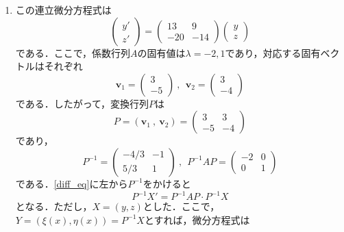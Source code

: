 \documentclass[a4paper,pdflatex,ja=standard]{bxjsarticle}
\begin{document}
\begin{enumerate}
  \item 
  この連立微分方程式は
  \begin{equation}
    \begin{pmatrix}
      y' \\
      z'
    \end{pmatrix}
    =
    \begin{pmatrix}
      13 & 9 \\
      -20 & -14
    \end{pmatrix}
    \begin{pmatrix}
      y \\
      z
    \end{pmatrix}
    \label{diff_eq}
  \end{equation}
  である．ここで，係数行列$A$の固有値は$\lambda=-2,1$であり，対応する固有ベクトルはそれぞれ
  \begin{equation}
    \bm{v}_{1}
    =
    \begin{pmatrix}
      3 \\
      -5
    \end{pmatrix}
    \ ,\ \ 
    \bm{v}_{2}
    =
    \begin{pmatrix}
      3 \\
      -4
    \end{pmatrix}
  \end{equation}
  である．したがって，変換行列$P$は
  \begin{equation}
    P
    =
    (\bm{v}_{1}\ ,\ \bm{v}_{2})
    =
    \begin{pmatrix}
      3 & 3 \\
      -5 & -4
    \end{pmatrix}
  \end{equation}
  であり，
  \begin{equation}
    P^{-1}
    =
    \begin{pmatrix}
      -4/3 & -1 \\
      5/3 & 1  
    \end{pmatrix}
    \ ,\ \ 
    P^{-1}AP
    =
    \begin{pmatrix}
      -2 & 0 \\
      0 & 1
    \end{pmatrix}
  \end{equation}
  である．\eqref{diff_eq}に左から$P^{-1}$をかけると
  \begin{equation}
    P^{-1}X'
    =
    P^{-1}AP\cdot P^{-1}X
  \end{equation}
  となる．ただし，$X=(y,z)$とした．ここで，$Y=(\xi(x),\eta(x))=P^{-1}X$とすれば，微分方程式は

\end{enumerate}
\end{document}
